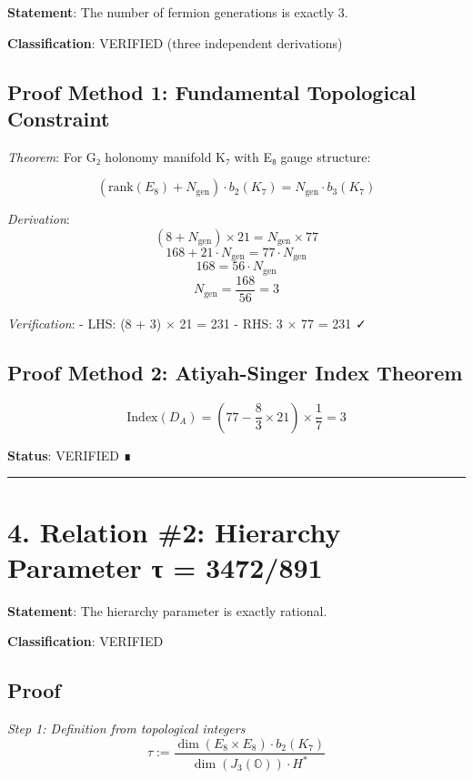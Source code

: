 \documentclass[11pt,a4paper]{article}
\begin{document}
\textbf{Statement}: The number of fermion generations is exactly 3.

\textbf{Classification}: VERIFIED (three independent derivations)

\subsection{Proof Method 1: Fundamental Topological Constraint}\label{proof-method-1-fundamental-topological-constraint}

\emph{Theorem}: For G₂ holonomy manifold K₇ with E₈ gauge structure:

\[(\text{rank}(E_8) + N_{\text{gen}}) \cdot b_2(K_7) = N_{\text{gen}} \cdot b_3(K_7)\]

\emph{Derivation}: \[(8 + N_{\text{gen}}) \times 21 = N_{\text{gen}} \times 77\] \[168 + 21 \cdot N_{\text{gen}} = 77 \cdot N_{\text{gen}}\] \[168 = 56 \cdot N_{\text{gen}}\] \[N_{\text{gen}} = \frac{168}{56} = 3\]

\emph{Verification}: - LHS: (8 + 3) × 21 = 231 - RHS: 3 × 77 = 231 ✓

\subsection{Proof Method 2: Atiyah-Singer Index Theorem}\label{proof-method-2-atiyah-singer-index-theorem}

\[\text{Index}(D_A) = \left( 77 - \frac{8}{3} \times 21 \right) \times \frac{1}{7} = 3\]

\textbf{Status}: VERIFIED ∎

\begin{center}\rule{\linewidth}{0.5pt}\end{center}

\section{4. Relation \#2: Hierarchy Parameter τ = 3472/891}\label{relation-2-hierarchy-parameter-ux3c4-3472891}

\textbf{Statement}: The hierarchy parameter is exactly rational.

\textbf{Classification}: VERIFIED

\subsection{Proof}\label{proof}

\emph{Step 1: Definition from topological integers} \[\tau := \frac{\dim(E_8 \times E_8) \cdot b_2(K_7)}{\dim(J_3(\mathbb{O})) \cdot H^*}\]
\end{document}
